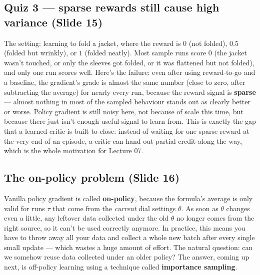 \documentclass[11pt]{article}
\begin{document}
\subsection{Quiz 3 --- sparse rewards still cause high variance (Slide 15)}
The setting: learning to fold a jacket, where the reward is $0$ (not folded), $0.5$ (folded but wrinkly), or $1$ (folded neatly). Most sample runs score $0$ (the jacket wasn't touched, or only the sleeves got folded, or it was flattened but not folded), and only one run scores well. Here's the failure: even after using reward-to-go and a baseline, the gradient's grade is almost the same number (close to zero, after subtracting the average) for nearly every run, because the reward signal is \textbf{sparse} --- almost nothing in most of the sampled behaviour stands out as clearly better or worse. Policy gradient is still noisy here, not because of scale this time, but because there just isn't enough useful signal to learn from. This is exactly the gap that a learned critic is built to close: instead of waiting for one sparse reward at the very end of an episode, a critic can hand out partial credit along the way, which is the whole motivation for Lecture 07.

\subsection{The on-policy problem (Slide 16)}
Vanilla policy gradient is called \textbf{on-policy}, because the formula's average is only valid for runs $\tau$ that come from the \emph{current} dial settings $\theta$. As soon as $\theta$ changes even a little, any leftover data collected under the old $\theta$ no longer comes from the right source, so it can't be used correctly anymore. In practice, this means you have to throw away all your data and collect a whole new batch after every single small update --- which wastes a huge amount of effort. The natural question: can we somehow reuse data collected under an older policy? The answer, coming up next, is off-policy learning using a technique called \textbf{importance sampling}.
\end{document}
